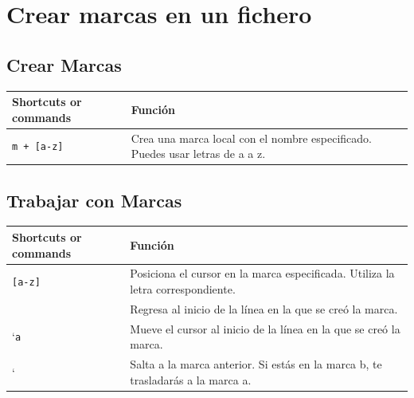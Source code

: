 \documentclass[
  doc,
  floatsintext,
  longtable,
  a4paper,
  nolmodern,
  notxfonts,
  notimes,
  12pt,
  colorlinks=true,linkcolor=blue,citecolor=blue,urlcolor=blue]{apa7}
\newcounter{none} %
\begin{document}
\section{Crear marcas en un fichero}\label{crear-marcas-en-un-fichero}

\subsection{Crear Marcas}\label{crear-marcas}

{\def\LTcaptype{none} %
\begin{longtable}[]{@{}
  >{\raggedright\arraybackslash}p{}
  >{\raggedright\arraybackslash}p{}@{}}
\toprule\noalign{}
\begin{minipage}[b]{\linewidth}\raggedright
Shortcuts or commands
\end{minipage} & \begin{minipage}[b]{\linewidth}\raggedright
Función
\end{minipage} \\
\midrule\noalign{}
\endhead
\bottomrule\noalign{}
\endlastfoot
\texttt{m\ +\ {[}a-z{]}} & Crea una marca local con el nombre
especificado. Puedes usar letras de a a z. \\
\end{longtable}
}

\subsection{Trabajar con Marcas}\label{trabajar-con-marcas}

{\def\LTcaptype{none} %
\begin{longtable}[]{@{}
  >{\raggedright\arraybackslash}p{}
  >{\raggedright\arraybackslash}p{}@{}}
\toprule\noalign{}
\begin{minipage}[b]{\linewidth}\raggedright
Shortcuts or commands
\end{minipage} & \begin{minipage}[b]{\linewidth}\raggedright
Función
\end{minipage} \\
\midrule\noalign{}
\endhead
\bottomrule\noalign{}
\endlastfoot
\texttt{{[}a-z{]}} & Posiciona el cursor en la marca especificada.
Utiliza la letra correspondiente. \\
\texttt{\textquotesingle{}} & Regresa al inicio de la línea en la que se
creó la marca. \\
`\texttt{a} & Mueve el cursor al inicio de la línea en la que se creó la
marca. \\
` & Salta a la marca anterior. Si estás en la marca b, te trasladarás a
la marca a. \\
\end{longtable}
}
\end{document}
